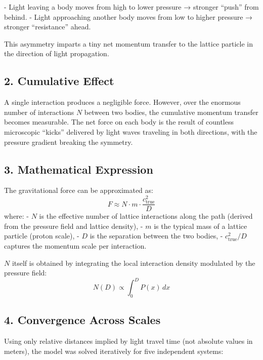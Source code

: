 \documentclass[11pt,a4paper]{book}
\begin{document}
- Light leaving a body moves from high to lower pressure → stronger “push” from behind.
- Light approaching another body moves from low to higher pressure → stronger “resistance” ahead.

This asymmetry imparts a tiny net momentum transfer to the lattice particle in the direction of light propagation.

\subsection{2. Cumulative Effect}
A single interaction produces a negligible force. However, over the enormous number of interactions \( N \) between two bodies, the cumulative momentum transfer becomes measurable. The net force on each body is the result of countless microscopic “kicks” delivered by light waves traveling in both directions, with the pressure gradient breaking the symmetry.

\subsection{3. Mathematical Expression}
The gravitational force can be approximated as:
\[
F \approx N \cdot m \cdot \frac{c_{\text{true}}^2}{D}
\]
where:
- \( N \) is the effective number of lattice interactions along the path (derived from the pressure field and lattice density),
- \( m \) is the typical mass of a lattice particle (proton scale),
- \( D \) is the separation between the two bodies,
- \( c_{\text{true}}^2 / D \) captures the momentum scale per interaction.

\( N \) itself is obtained by integrating the local interaction density modulated by the pressure field:
\[
N(D) \propto \int_0^D P(x) \, dx
\]

\subsection{4. Convergence Across Scales}
Using only relative distances implied by light travel time (not absolute values in meters), the model was solved iteratively for five independent systems:
\end{document}
